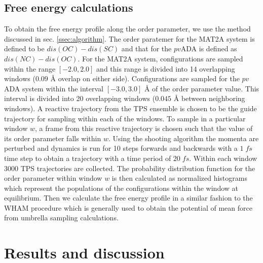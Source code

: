 \documentclass[journal=jpcbfk,manuscript=article,layout=traditional]{achemso}
\begin{document}
\subsection{Free energy calculations}
To obtain the free energy profile along the order parameter, we use the method 
discussed in sec. \ref{ssec:algorithm}. The order paratemer for the MAT2A system 
is defined to be $dis(OC)-dis(SC)$ and that for the $pv$ADA is defined as 
$dis(NC)-dis(OC)$. For the MAT2A system, configurations are sampled within 
the range $[-2.0,2.0]$ and this range is divided into 14 overlapping windows 
($0.09$ {\AA} overlap on either side). 
Configurations are sampled for the $pv$ADA system within the interval $[-3.0, 3.0]$ {\AA}
of the order parameter value. 
This interval is divided into 20 overlapping windows ($0.045$ {\AA} between 
neighboring windows). A reactive trajectory from the TPS ensemble is chosen to be the guide trajectory 
for sampling within each of the windows. To sample in a particular window $w$, a 
frame from this reactive trajectory is chosen such that the value of its 
order parameter falls within $w$. Using the shooting algorithm
the momenta are perturbed and dynamics is run for 10 steps forwards and backwards with a 
$1\;fs$ time step to obtain a trajectory with a time period of $20\;fs$.    
Within each window 3000 TPS trajectories are collected. The 
probability distribution function for the order parameter within window $w$ 
is then calculated as normalized histograms which represent the populations 
of the configurations within the window at equilibrium. 
Then we calculate the free energy profile in a similar fashion to the WHAM 
procedure \cite{Kumar92JComputChem13p1011} which is generally used to obtain the 
potential of mean force from umbrella sampling calculations. 
\section{Results and discussion}
\end{document}
